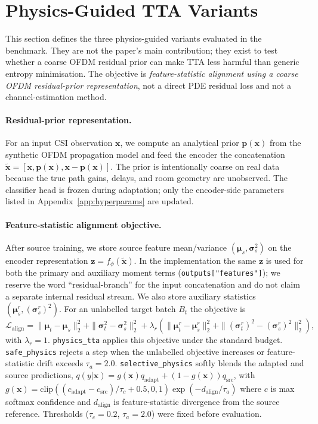 \section{Physics-Guided TTA Variants}
\label{sec:method}

This section defines the three physics-guided variants evaluated in the
benchmark. They are not the paper's main contribution; they exist to test
whether a coarse OFDM residual prior can make TTA less harmful than generic
entropy minimisation. The objective is \emph{feature-statistic alignment using a
coarse OFDM residual-prior representation}, not a direct PDE residual loss and
not a channel-estimation method.

\paragraph{Residual-prior representation.}
For an input CSI observation $\mathbf{x}$, we compute an analytical prior
$\mathbf{p}(\mathbf{x})$ from the synthetic OFDM propagation model and feed the
encoder the concatenation
$\tilde{\mathbf{x}}=[\mathbf{x},\mathbf{p}(\mathbf{x}),\mathbf{x}-\mathbf{p}(\mathbf{x})]$.
The prior is intentionally coarse on real data because the true path gains,
delays, and room geometry are unobserved. The classifier head is frozen during
adaptation; only the encoder-side parameters listed in
Appendix~\ref{app:hyperparams} are updated.

\paragraph{Feature-statistic alignment objective.}
After source training, we store source feature mean/variance
$(\boldsymbol{\mu}_s,\boldsymbol{\sigma}_s^2)$ on the encoder representation
$\mathbf{z}=f_\phi(\tilde{\mathbf{x}})$. In the implementation the same
$\mathbf{z}$ is used for both the primary and auxiliary moment terms
(\texttt{outputs["features"]}); we reserve the word ``residual-branch'' for
the input concatenation and do not claim a separate internal residual stream.
We also store auxiliary
statistics $(\boldsymbol{\mu}^{r}_s,(\boldsymbol{\sigma}^{r}_s)^2)$. For an
unlabelled target batch $B_t$ the objective is
\[
    \mathcal{L}_{\text{align}}
    = \|\boldsymbol{\mu}_t-\boldsymbol{\mu}_s\|_2^2
    + \|\boldsymbol{\sigma}_t^2-\boldsymbol{\sigma}_s^2\|_2^2
    + \lambda_r\!\left(
        \|\boldsymbol{\mu}^{r}_t-\boldsymbol{\mu}^{r}_s\|_2^2
        + \|(\boldsymbol{\sigma}^{r}_t)^2-(\boldsymbol{\sigma}^{r}_s)^2\|_2^2
      \right),
\]
with $\lambda_r=1$. \texttt{physics\_tta} applies this objective under the
standard budget. \texttt{safe\_physics} rejects a step when the unlabelled
objective increases or feature-statistic drift exceeds $\tau_a=2.0$.
\texttt{selective\_physics} softly blends the adapted and source predictions,
$q(y|\mathbf{x})=g(\mathbf{x})q_{\text{adapt}}+(1-g(\mathbf{x}))q_{\text{src}}$,
with
$g(\mathbf{x})=\mathrm{clip}((c_{\text{adapt}}-c_{\text{src}})/\tau_c+0.5,0,1)\exp(-d_{\text{align}}/\tau_a)$
where $c$ is max softmax confidence and $d_{\text{align}}$ is feature-statistic
divergence from the source reference. Thresholds ($\tau_c{=}0.2$,
$\tau_a{=}2.0$) were fixed before evaluation.

